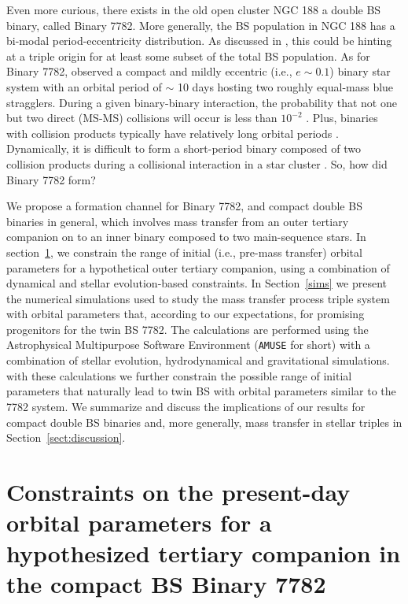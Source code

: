 \documentclass{aastex62}
\begin{document}
Even more curious, there exists in the old open cluster NGC 188 a
double BS binary, called Binary 7782.  More generally, the BS
population in NGC 188 has a bi-modal period-eccentricity distribution.
As discussed in \citet{2011MNRAS.410.2370L}, this could be hinting at
a triple origin for at least some subset of the total BS population.
As for Binary 7782, \citet{2009Natur.462.1032M} observed a compact and
mildly eccentric (i.e., $e \sim 0.1$) binary star system with an
orbital period of $\sim$ 10 days hosting two roughly equal-mass blue
stragglers.  During a given binary-binary interaction, the probability
that not one but two direct (MS-MS) collisions will occur is less than
$10^{-2}$
\citep{1989AJ.....98..217L,2011MNRAS.410.2370L,2012MNRAS.425.2369L}.
Plus, binaries with collision products typically have relatively long
orbital periods \cite{2011Sci...334.1380F}. Dynamically, it is
difficult to form a short-period binary composed of two collision
products during a collisional interaction in a star cluster
\citep{2011Sci...334.1380F}.  So, how did Binary 7782 form?

We propose a formation channel for Binary 7782, and compact double BS
binaries in general, which involves mass transfer from an outer
tertiary companion on to an inner binary composed to two main-sequence
stars.  In section~\ref{sect:dyn}, we constrain the range of initial
(i.e., pre-mass transfer) orbital parameters for a hypothetical outer
tertiary companion, using a combination of dynamical and stellar
evolution-based constraints.  In Section~\ref{sims} we present the
numerical simulations used to study the mass transfer process triple
system with orbital parameters that, according to our expectations,
for promising progenitors for the twin BS 7782.  The calculations are
performed using the Astrophysical Multipurpose Software Environment
(\texttt{AMUSE} for short) \cite{AMUSE} with a combination of stellar
evolution, hydrodynamical and gravitational simulations.  with these
calculations we further constrain the possible range of initial
parameters that naturally lead to twin BS with orbital parameters
similar to the 7782 system.  We summarize and discuss the implications
of our results for compact double BS binaries and, more generally,
mass transfer in stellar triples in Section~\ref{sect:discussion}.

\section{Constraints on the present-day orbital parameters for a hypothesized
         tertiary companion in the compact BS Binary 7782} \label{sect:dyn}
\end{document}
